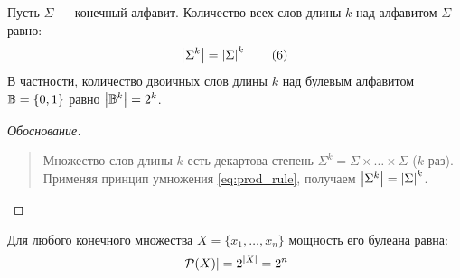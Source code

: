 \begin{proposition}
    Пусть $\Sigma$ --- конечный алфавит. Количество всех слов длины $k$ над 
    алфавитом $\Sigma$ равно:
    \begin{equation} \label{eq:words_count}
        \left| \Sigma^k \right| = \left| \Sigma \right|^k \tag{6}
    \end{equation}
    В частности, количество двоичных слов длины $k$ над булевым алфавитом 
    $\mathbb{B} = \{0, 1\}$ равно $\left| \mathbb{B}^k \right| = 2^k$.
\end{proposition}

\begin{proof}[Обоснование]~\\
    \begin{quote}
        Множество слов длины $k$ есть декартова степень $\Sigma^k = 
        \Sigma \times \dots \times \Sigma$ ($k$ раз). Применяя принцип 
        умножения \eqref{eq:prod_rule}, получаем 
        $\left| \Sigma^k \right| = \left| \Sigma \right|^k$.
    \end{quote}
\end{proof}

\begin{proposition}
    Для любого конечного множества $X = \{x_1, \dots, x_n\}$ мощность его 
    булеана равна:
    \[
        \left| \mathcal{P}(X) \right| = 2^{\left| X \right|} = 2^n
    \]
\end{proposition}

